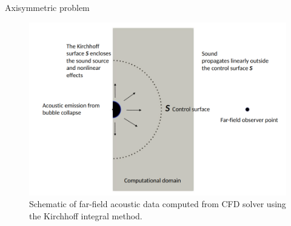 \documentclass[10pt, aspectratio=169]{beamer}
\begin{document}
\begin{frame}{Axisymmetric problem}
	\begin{figure}
		\centering
		\includegraphics[scale=0.22]{images/schematic.png}
		\caption*{Schematic of far-field acoustic data computed from CFD solver using the Kirchhoff integral method.}
	\end{figure}
\end{frame}
\end{document}

